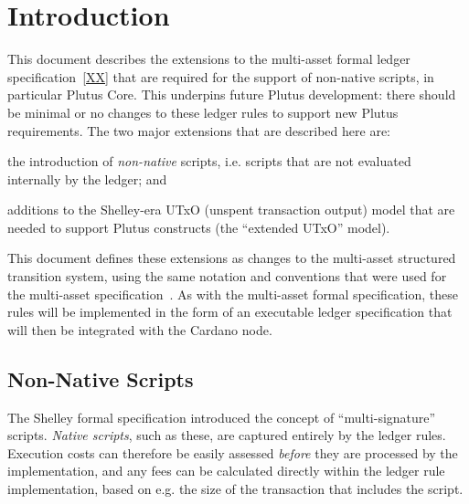 \section{Introduction}


This document describes the extensions to the multi-asset formal ledger specification~\ref{XX}  that are
required for the support of non-native scripts, in particular Plutus Core. This underpins future Plutus development: there should be minimal or no changes to these ledger rules to support new Plutus requirements.
%
The two major extensions that are described here are:
\begin{inparaenum}
\item
the introduction
of \emph{non-native} scripts, i.e. scripts that are not evaluated internally by the ledger; and
\item
  additions to the Shelley-era UTxO (unspent transaction output) model that are needed to support Plutus
  constructs (the ``extended UTxO'' model).
\end{inparaenum}
This document defines these extensions as changes to the multi-asset structured transition system,
using the same notation and conventions that were used for the multi-asset specification~\cite{XX}.
As with the multi-asset formal specification, these rules will be implemented in the form of an executable ledger specification that will then be
integrated with the Cardano node.

\subsection{Non-Native Scripts}

The Shelley formal specification introduced the concept of ``multi-signature'' scripts.
\emph{Native scripts}, such as these, are captured entirely by the ledger rules.
Execution costs can therefore be easily assessed \emph{before} they are processed by the implementation,
and any fees can be calculated directly within the ledger rule implementation,
based on e.g. the size of the transaction that includes the script.

